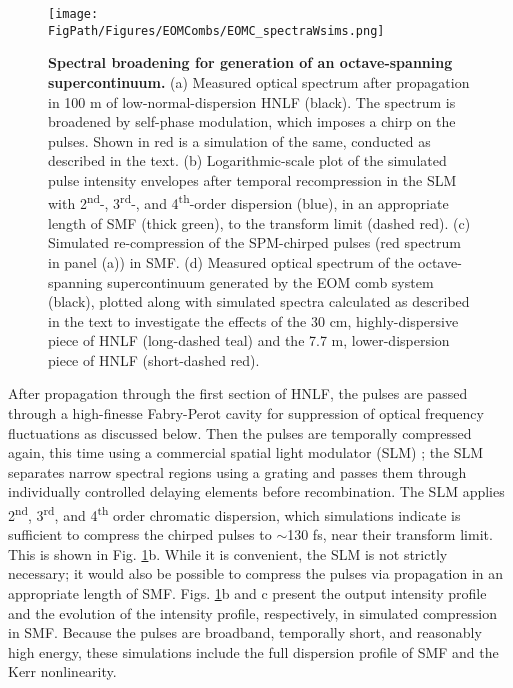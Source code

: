 \begin{figure}[htpb]
	\begin{center}
		\texttt{[image: \\FigPath/Figures/EOMCombs/EOMC\_spectraWsims.png]}
	\end{center}
	\caption[Figure Title]{\textbf{Spectral broadening for generation of an octave-spanning supercontinuum.} (a) Measured optical spectrum after propagation in 100 m of low-normal-dispersion HNLF (black). The spectrum is broadened by self-phase modulation, which imposes a chirp on the pulses. Shown in red is a simulation of the same, conducted as described in the text. (b) Logarithmic-scale plot of the simulated pulse intensity envelopes after temporal recompression in the SLM with 2\textsuperscript{nd}-, 3\textsuperscript{rd}-, and 4\textsuperscript{th}-order dispersion (blue), in an appropriate length of SMF (thick green), to the transform limit (dashed red). (c) Simulated re-compression of the SPM-chirped pulses (red spectrum in panel (a)) in SMF. (d) Measured optical spectrum of the octave-spanning supercontinuum generated by the EOM comb system (black), plotted along with simulated spectra calculated as described in the text to investigate the effects of the 30 cm, highly-dispersive piece of HNLF (long-dashed teal) and the 7.7 m, lower-dispersion piece of HNLF (short-dashed red).}
	\label{fig:EOMC_Broadening}
\end{figure} 

After propagation through the first section of HNLF, the pulses are passed through a high-finesse Fabry-Perot cavity for suppression of optical frequency fluctuations as discussed below. Then the pulses are temporally compressed again, this time using a commercial spatial light modulator (SLM) \cite{Weiner2000}; the SLM separates narrow spectral regions using a grating and passes them through individually controlled delaying elements before recombination. The SLM applies 2\textsuperscript{nd}, 3\textsuperscript{rd}, and 4\textsuperscript{th} order chromatic dispersion, which simulations indicate is sufficient to compress the chirped pulses to $\sim$130 fs, near their transform limit. This is shown in Fig. \ref{fig:EOMC_Broadening}b. While it is convenient, the SLM is not strictly necessary; it would also be possible to compress the pulses via propagation in an appropriate length of SMF. Figs. \ref{fig:EOMC_Broadening}b and c present the output intensity profile and the evolution of the intensity profile, respectively, in simulated compression in SMF. Because the pulses are broadband, temporally short, and reasonably high energy, these simulations include the full dispersion profile of SMF and the Kerr nonlinearity.



